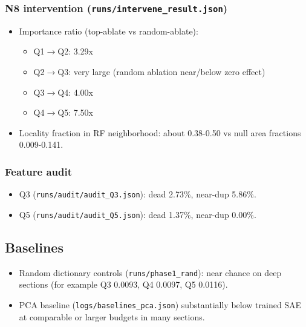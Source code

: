 \documentclass[11pt]{article}
\begin{document}
\subsubsection{N8 intervention (\texttt{runs/intervene\_result.json})}
\begin{itemize}[leftmargin=*]
    \item Importance ratio (top-ablate vs random-ablate):
    \begin{itemize}[leftmargin=*]
        \item Q1$\rightarrow$Q2: 3.29x
        \item Q2$\rightarrow$Q3: very large (random ablation near/below zero effect)
        \item Q3$\rightarrow$Q4: 4.00x
        \item Q4$\rightarrow$Q5: 7.50x
    \end{itemize}
    \item Locality fraction in RF neighborhood: about 0.38-0.50 vs null area fractions 0.009-0.141.
\end{itemize}

\subsubsection{Feature audit}
\begin{itemize}[leftmargin=*]
    \item Q3 (\texttt{runs/audit/audit\_Q3.json}): dead 2.73\%, near-dup 5.86\%.
    \item Q5 (\texttt{runs/audit/audit\_Q5.json}): dead 1.37\%, near-dup 0.00\%.
\end{itemize}

\subsection{Baselines}
\begin{itemize}[leftmargin=*]
    \item Random dictionary controls (\texttt{runs/phase1\_rand}): near chance on deep sections (for example Q3 0.0093, Q4 0.0097, Q5 0.0116).
    \item PCA baseline (\texttt{logs/baselines\_pca.json}) substantially below trained SAE at comparable or larger budgets in many sections.
\end{itemize}
\end{document}
